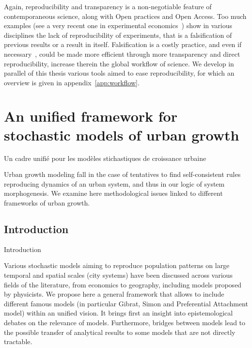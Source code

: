 Again, reproducibility and transparency is a non-negotiable feature of contemporaneous science, along with Open practices and Open Access. Too much examples (see a very recent one in experimental economics~\cite{camerer2016evaluating}) show in various disciplines the lack of reproducibility of experiments, that is a falsification of previous results or a result in itself. Falsification is a costly practice, and even if necessary~\cite{chavalarias2005nobel}, could be made more efficient through more transparency and direct reproducibility, increase therein the global workflow of science. We develop in parallel of this thesis various tools aimed to ease reproducibility, for which an overview is given in appendix~\ref{app:workflow}.






\newpage

\section{An unified framework for stochastic models of urban growth}{Un cadre unifié pour les modèles stichastiques de croissance urbaine}

Urban growth modeling fall in the case of tentatives to find self-consistent rules reproducing dynamics of an urban system, and thus in our logic of system morphogenesis. We examine here methodological issues linked to different frameworks of urban growth.

\subsection{Introduction}{Introduction}

Various stochastic models aiming to reproduce population patterns on large temporal and spatial scales (city systems) have been discussed across various fields of the literature, from economics to geography, including models proposed by physicists. We propose here a general framework that allows to include different famous models (in particular Gibrat, Simon and Preferential Attachment model) within an unified vision. It brings first an insight into epistemological debates on the relevance of models. Furthermore, bridges between models lead to the possible transfer of analytical results to some models that are not directly tractable.


